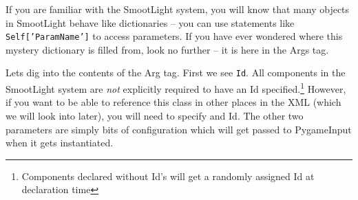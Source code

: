 \documentclass{article}
\begin{document}
        If you are familiar with the SmootLight system, you will know that many objects in
        SmootLight behave like dictionaries -- you can use statements like
        \texttt{Self['ParamName']} to access parameters.  If you have ever wondered where this
        mystery dictionary is filled from, look no further -- it is here in the Args tag.  

        Lets dig into the contents of the Arg tag.  First we see \texttt{Id}.  All components in the
        SmootLight system are \emph{not} explicitly required to have an Id
        specified.\footnote{Components declared without Id's will get a randomly assigned Id at
        declaration time}
        However, if you want to be able to reference this class in other places in the XML (which
        we will look into later), you will need to specify and Id.  The other two parameters are
        simply bits of configuration which will get passed to PygameInput when it gets instantiated.
        
\end{document}
